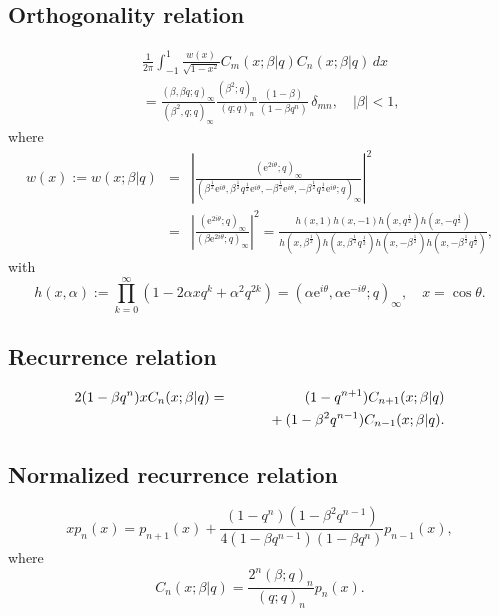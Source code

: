 \documentclass[envcountchap,graybox]{svmono}
\newcommand{\mathindent}{\hspace{7.5mm}}
\newcommand{\e}{\textrm{e}}
\begin{document}
\subsection*{Orthogonality relation}
\begin{eqnarray}
\label{OrtContqUltra}
& &\frac{1}{2\pi}\int_{-1}^1\frac{w(x)}{\sqrt{1-x^2}}C_m(x;\beta|q)C_n(x;\beta|q)\,dx\nonumber\\
& &{}=\frac{(\beta,\beta q;q)_{\infty}}{(\beta^2,q;q)_{\infty}}
\frac{(\beta^2;q)_n}{(q;q)_n}\frac{(1-\beta)}{(1-\beta q^n)}\,\delta_{mn},\quad|\beta|<1,
\end{eqnarray}
where
\begin{eqnarray*}
w(x):=w(x;\beta|q)&=&\left|\frac{(\e^{2i\theta};q)_{\infty}}
{(\beta^{\frac{1}{2}}\e^{i\theta},\beta^{\frac{1}{2}}q^{\frac{1}{2}}\e^{i\theta},
-\beta^{\frac{1}{2}}\e^{i\theta},-\beta^{\frac{1}{2}}q^{\frac{1}{2}}\e^{i\theta};q)_{\infty}}\right|^2\\
&=&\left|\frac{(\e^{2i\theta};q)_{\infty}}{(\beta\e^{2i\theta};q)_{\infty}}\right|^2
=\frac{h(x,1)h(x,-1)h(x,q^{\frac{1}{2}})h(x,-q^{\frac{1}{2}})}
{h(x,\beta^{\frac{1}{2}})h(x,\beta^{\frac{1}{2}}q^{\frac{1}{2}})
h(x,-\beta^{\frac{1}{2}})h(x,-\beta^{\frac{1}{2}}q^{\frac{1}{2}})},
\end{eqnarray*}
with
$$h(x,\alpha):=\prod_{k=0}^{\infty}\left(1-2\alpha xq^k+\alpha^2q^{2k}\right)
=\left(\alpha\e^{i\theta},\alpha\e^{-i\theta};q\right)_{\infty},\quad x=\cos\theta.$$

\subsection*{Recurrence relation}
\begin{eqnarray}
\label{RecContqUltra}
2(1-\beta q^n)xC_n(x;\beta|q)&=&(1-q^{n+1})C_{n+1}(x;\beta|q)\nonumber\\
& &{}\mathindent{}+(1-\beta^2 q^{n-1})C_{n-1}(x;\beta|q).
\end{eqnarray}

\subsection*{Normalized recurrence relation}
\begin{equation}
\label{NormRecContqUltra}
xp_n(x)=p_{n+1}(x)+
\frac{(1-q^n)(1-\beta^2q^{n-1})}{4(1-\beta q^{n-1})(1-\beta q^n)}p_{n-1}(x),
\end{equation}
where
$$C_n(x;\beta|q)=\frac{2^n(\beta;q)_n}{(q;q)_n}p_n(x).$$
\end{document}
